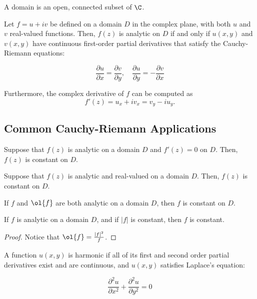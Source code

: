 \begin{definition}[Domain]
    A domain is an open, connected subset of $\C$.
\end{definition}

\begin{theorem}
    Let $f=u + iv$ be defined on a domain $D$ in the complex plane, with both $u$ and $v$ real-valued functions. Then, $f(z)$ is analytic on $D$ if and only if $u(x,y)$ and $v(x,y)$ have continuous first-order partial derivatives that satisfy the Cauchy-Riemann equations:

    \[\frac{\partial u}{\partial x} = \frac{\partial v}{\partial y}, \quad \frac{\partial u}{\partial y} = -\frac{\partial v}{\partial x}\]

    Furthermore, the complex derivative of $f$ can be computed as
    \[f'(z) = u_x + iv_x = v_y - iu_y.\]
\end{theorem}

\subsection{Common Cauchy-Riemann Applications}
\begin{proposition}
    Suppose that $f(z)$ is analytic on a domain $D$ and $f'(z) = 0$ on $D$. Then, $f(z)$ is constant on $D$.
\end{proposition}

\begin{proposition}
    Suppose that $f(z)$ is analytic and real-valued on a domain $D$. Then, $f(z)$ is constant on $D$.
\end{proposition}

\begin{proposition}
    If $f$ and $\ol{f}$ are both analytic on a domain $D$, then $f$ is constant on $D$.
\end{proposition}

\begin{proposition}
    If $f$ is analytic on a domain $D$, and if $|f|$ is constant, then $f$ is constant.
\end{proposition}

\begin{proof}
    Notice that $\ol{f} = \frac{|f|^2}{f}$.
\end{proof}


\begin{definition}[Harmonic]
    A function $u(x,y)$ is harmonic if all of its first and second order partial derivatives exist and are continuous, and $u(x,y)$ satisfies Laplace's equation:

    \[\frac{\partial^2 u}{\partial x^2} + \frac{\partial^2 u}{\partial y^2}=0\]
\end{definition}

